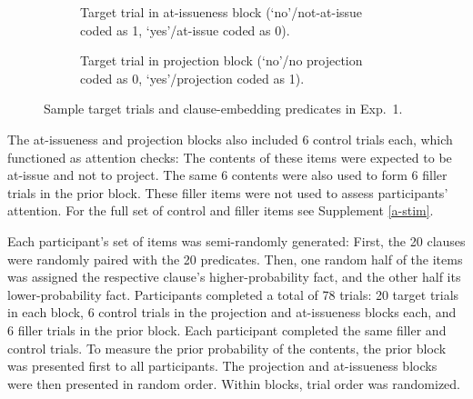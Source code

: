 \documentclass[11pt,fleqn]{article}
\newcommand{\6}{\mbox{$[\hspace*{-.6mm}[$}}
\newcommand{\9}{\mbox{$]\hspace*{-.6mm}]$}}
\begin{document}
\begin{figure}[h!]
\begin{subfigure}[t]{0.5\textwidth}
\caption{Target trial in at-issueness block (`no'/not-at-issue coded as 1, `yes'/at-issue coded as 0).}\label{fig-exp1-nai}
 \end{subfigure}%
 \hspace*{.3cm} \begin{subfigure}[t]{0.5\textwidth}
\par\bigskip
\centering
\caption{Target trial in projection block (`no'/no projection coded as 0, `yes'/projection coded as 1).}\label{fig-exp1-projection}
 \end{subfigure}

\caption{Sample target trials and clause-embedding predicates in Exp.~1.}
\end{figure}

The at-issueness and projection blocks also included 6 control trials each, which functioned as attention checks: The contents of these items were expected to be at-issue and not to project. The same 6 contents were also used to form 6 filler trials in the prior block. These filler items were not used to assess participants' attention. For the full set of control and filler items see Supplement \ref{a-stim}.

Each participant's set of items was semi-randomly generated: First, the 20 clauses were randomly paired with the 20 predicates. Then, one random half of the items was assigned the respective clause's higher-probability fact, and the other half its lower-probability fact. Participants completed a total of 78 trials: 20 target trials in each block, 6 control trials in the projection and at-issueness blocks each, and 6 filler trials in the prior block. Each participant completed the same filler and control trials.  To measure the prior probability of the contents,  the prior block was presented first to all participants. The projection and at-issueness blocks were then presented in random order. Within blocks, trial order was randomized.
\end{document}

